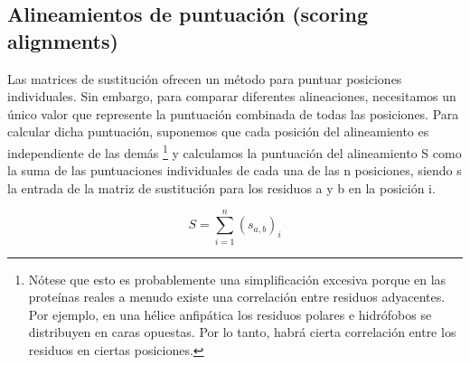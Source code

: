 
\subsection{Alineamientos de puntuación (scoring alignments)}
Las matrices de sustitución ofrecen un método para puntuar posiciones individuales. Sin embargo, para comparar diferentes alineaciones, necesitamos un único valor que represente la puntuación combinada de todas las posiciones. Para calcular dicha puntuación, suponemos que cada posición del alineamiento es independiente de las demás \footnote{Nótese que esto es probablemente una simplificación excesiva porque en las proteínas reales a menudo existe una correlación entre residuos adyacentes. Por ejemplo, en una hélice anfipática los residuos polares e hidrófobos se distribuyen en caras opuestas. Por lo tanto, habrá cierta correlación entre los residuos en ciertas posiciones.} y calculamos la puntuación del alineamiento S como la suma de las puntuaciones individuales de cada una de las n posiciones, siendo s la entrada de la matriz de sustitución para los residuos a y b en la posición i.

$$S = \sum_{i = 1}^{n} (s_{a,b})_i$$

